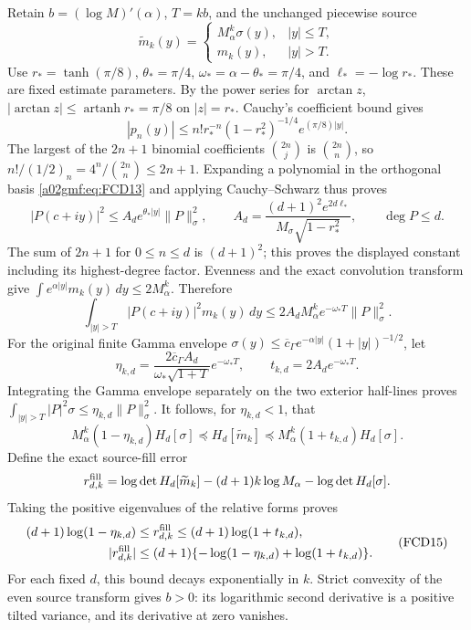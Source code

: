 \documentclass[11pt,a4paper]{article}
\begin{document}
Retain \(b=(\log M)'(\alpha)\), \(T=kb\), and the unchanged
piecewise source
\[
 \widetilde m_k(y)=
 \begin{cases}M_\alpha^k\sigma(y),&|y|\le T,\\
 m_k(y),&|y|>T.
 \end{cases}
\]
Use \(r_*=\tanh(\pi/8)\), \(\theta_*=\pi/4\),
\(\omega_*=\alpha-\theta_*=\pi/4\), and
\(\ell_*=-\log r_*\). These are fixed estimate parameters.
By the power series for \(\arctan z\),
\(|\arctan z|\le\operatorname{artanh}r_*=\pi/8\) on \(|z|=r_*\).
Cauchy's coefficient bound gives
\[
 |p_n(y)|\le n!r_*^{-n}(1-r_*^2)^{-1/4}
                                    e^{(\pi/8)|y|}.
\]
The largest of the \(2n+1\) binomial coefficients
\(\binom{2n}{j}\) is \(\binom{2n}{n}\), so
\(n!/(1/2)_n=4^n/\binom{2n}{n}\le2n+1\).
Expanding a polynomial in the orthogonal basis \eqref{a02gmf:eq:FCD13}
and applying Cauchy--Schwarz thus proves
\[
 |P(c+iy)|^2\le A_d e^{\theta_*|y|}\|P\|_\sigma^2,\qquad
 A_d=\frac{(d+1)^2e^{2d\ell_*}}
             {M_\sigma\sqrt{1-r_*^2}},
       \qquad \deg P\le d .
\]
The sum of \(2n+1\) for \(0\le n\le d\) is \((d+1)^2\);
this proves the displayed constant including its highest-degree factor.
Evenness and the exact convolution transform give
\(\int e^{\alpha|y|}m_k(y)\,dy\le2M_\alpha^k\).
Therefore
\[
 \int_{|y|>T}|P(c+iy)|^2m_k(y)\,dy
  \le2A_dM_\alpha^ke^{-\omega_*T}\|P\|_\sigma^2 .
\]
For the original finite Gamma envelope
\(\sigma(y)\le\overline c_\Gamma
e^{-\alpha|y|}(1+|y|)^{-1/2}\), let
\[
 \eta_{k,d}=\frac{2\overline c_\Gamma A_d}
                 {\omega_*\sqrt{1+T}}e^{-\omega_*T},
 \qquad t_{k,d}=2A_de^{-\omega_*T}.
\]
Integrating the Gamma envelope separately on the two exterior half-lines
proves
\(\int_{|y|>T}|P|^2\sigma\le\eta_{k,d}\|P\|_\sigma^2\).
It follows, for \(\eta_{k,d}<1\), that
\[
 M_\alpha^k(1-\eta_{k,d})H_d[\sigma]
  \preceq H_d[\widetilde m_k]
  \preceq M_\alpha^k(1+t_{k,d})H_d[\sigma].
\]
Define the exact source-fill error
\[
 r_{d,k}^{\rm fill}
   =\log\det H_d[\widetilde m_k]
        -(d+1)k\log M_\alpha-\log\det H_d[\sigma].
\]
Taking the positive eigenvalues of the relative forms proves
\begin{equation}
 \begin{split}
 (d+1)\log(1-\eta_{k,d})
       &\le r_{d,k}^{\rm fill}
                 \le(d+1)\log(1+t_{k,d}),\\
 |r_{d,k}^{\rm fill}|
       &\le(d+1)\{-\log(1-\eta_{k,d})+\log(1+t_{k,d})\}.
 \end{split}
 \tag{FCD15}\label{a02gmf:eq:FCD15}
\end{equation}
For each fixed \(d\), this bound decays exponentially in \(k\).
Strict convexity of the even source transform gives \(b>0\):
its logarithmic second derivative is a positive tilted variance, and
its derivative at zero vanishes.
\end{document}
